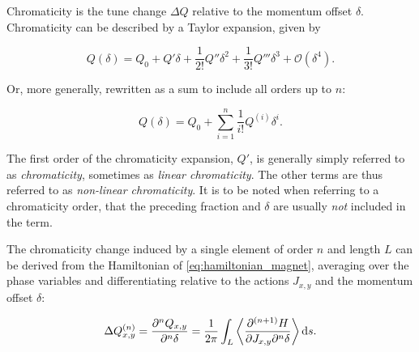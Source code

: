 \section{}

\subsection{}
\label{subsection:concepts:chromaticity}

Chromaticity is the tune change $\Delta Q$ relative to the momentum offset $\delta$. Chromaticity
can be described by a Taylor expansion, given by

\begin{equation} 
    Q (\delta) = Q_0 + Q' \delta + \frac{1}{2!} Q'' \delta^2 + \frac{1}{3!} Q''' \delta^3 + \mathcal{O}(\delta^4).
    \label{eq:background_chromaticity}
\end{equation}

Or, more generally, rewritten as a sum to include all orders up to $n$:

\begin{equation}
    Q (\delta) = Q_0 + \sum_{i=1}^n \frac{1}{i!} Q^{(i)} \delta^i.
    \label{eq:background_chromaticity_sum}
\end{equation}


The first order of the chromaticity expansion, $Q'$, is generally simply referred to as 
\textit{chromaticity}, sometimes as \textit{linear chromaticity}.
The other terms are thus referred to as \textit{non-linear chromaticity}.
It is to be noted when referring to a chromaticity order, that the preceding fraction and
$\delta$ are usually \textit{not} included in the term.

The chromaticity change induced by a single element of order $n$ and length $L$ can be derived from
the Hamiltonian of \cref{eq:hamiltonian_magnet}, averaging over the phase variables and
differentiating relative to the actions $J_{x,y}$ and the momentum offset $\delta$:

\begin{equation}
    \Delta Q^{(n)}_{x,y} = \frac{\partial^n Q_{x,y}}{\partial^n \delta} = 
      \frac{1}{2\pi} \int_L \left< \frac{\partial^{(n+1)} H}{\partial J_{x,y}\partial^n \delta}\right> \mathop{}\!\mathrm{d} s.
    \label{eq:background_chroma_order_hamiltonian}
\end{equation}

